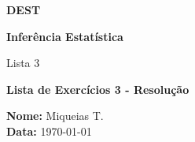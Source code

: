 \documentclass[12pt, a4paper]{article}
\begin{document}
\begin{titlepage}
    \centering


    {\Huge \textbf{DEST}}\par

    \vspace{2cm}

    {\Large \textbf{Inferência Estatística}} \par
    {\Large Lista 3 } \par

    \vspace{2.5cm}

    {\Large \textbf{Lista de Exercícios 3 - Resolução}}

    \vfill %

    \large
    \begin{flushleft}
    \textbf{Nome:} Miqueias T. \\
    \textbf{Data:} \today
    \end{flushleft}
\end{titlepage}

\end{document}
